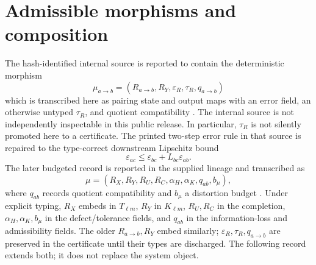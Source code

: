 \documentclass[11pt,a4paper]{article}
\theoremstyle{definition}
\theoremstyle{plain}
\theoremstyle{remark}
\begin{document}
\section{Admissible morphisms and composition}\label{sec:morphisms}

The hash-identified internal source is reported to contain the deterministic
morphism
\[
\mu_{a\to b}=(R_{a\to b},R_Y,\varepsilon_R,\tau_R,q_{a\to b})
\]
which is transcribed here as pairing state and output maps with an error
field, an otherwise untyped \(\tau_R\), and quotient compatibility
\citep{BSCvol1}.  The internal source is not independently inspectable in this
public release.  In particular,
\(\tau_R\) is not silently promoted here to a certificate.  The printed
two-step error rule in that source is repaired to the type-correct downstream
Lipschitz bound
\[
\varepsilon_{ac}\le \varepsilon_{bc}+L_{bc}\varepsilon_{ab}.
\]
The later budgeted record is reported in the supplied lineage and transcribed
as
\[
\mu=(R_X,R_Y,R_U,R_C,\alpha_H,\alpha_K,q_{ab},b_\mu),
\]
where \(q_{ab}\) records quotient compatibility and \(b_\mu\) a distortion
budget \citep{BSCvol2}.  Under explicit typing, \(R_X\) embeds in
\(T_{\ell m}\), \(R_Y\) in \(K_{\ell m}\), \(R_U,R_C\) in the completion,
\(\alpha_H,\alpha_K,b_\mu\) in the defect/tolerance fields, and \(q_{ab}\) in
the information-loss and admissibility fields.  The older \(R_{a\to b},R_Y\)
embed similarly; \(\varepsilon_R,\tau_R,q_{a\to b}\) are preserved in the
certificate until their types are discharged.  The following record extends
both; it does not replace the system object.
\end{document}

